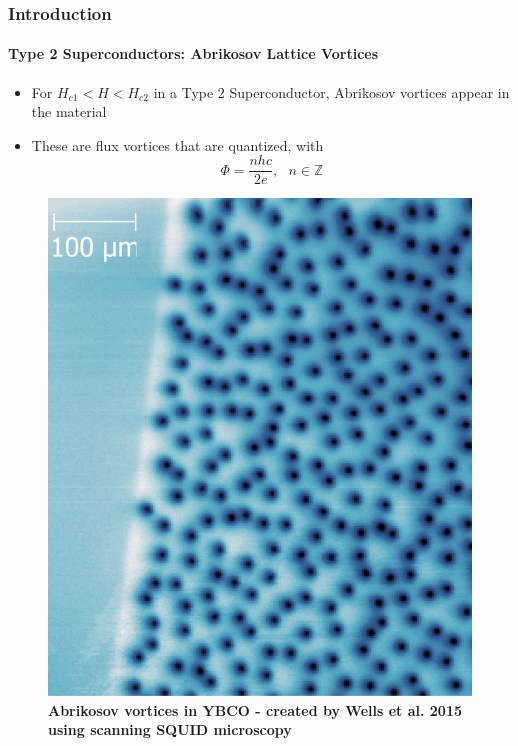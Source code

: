 \documentclass[12pt]{beamer}
\begin{document}
\begin{frame}
\frametitle{Introduction}
\framesubtitle{Type 2 Superconductors: Abrikosov Lattice Vortices}

\begin{itemize}
  \item For $H_{c1}<H<H_{c2}$ in a Type 2 Superconductor, Abrikosov vortices appear in the material
  \pause
  \item These are flux vortices that are quantized, with
  \[\Phi = \frac{nhc}{2e}, \,  \, \, \, n \in \mathbb{Z}\]
\end{itemize}
\pause
\begin{figure}[h]
  \includegraphics[scale = 0.08]{YBCO_vortices.jpg}
  \caption{\textbf{Abrikosov vortices in YBCO - created by Wells et al. 2015 using scanning SQUID microscopy}}
\end{figure}
\end{frame}
\end{document}
